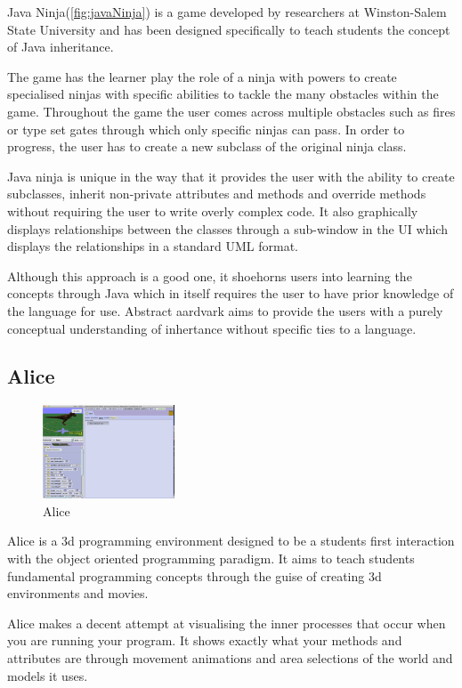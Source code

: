 \documentclass{l4proj}
\begin{document}
Java Ninja(\ref{fig:javaNinja}) is a game developed by researchers\cite{6632635} at Winston-Salem State University and has been designed specifically to teach students the concept of Java inheritance.

The game has the learner play the role of a ninja with powers to create specialised ninjas with specific abilities to tackle the many obstacles within the game. Throughout the game the user comes across multiple obstacles such as fires or type set gates through which only specific ninjas can pass. In order to progress, the user has to create a new subclass of the original ninja class. 

Java ninja is unique in the way that it provides the user with the ability to create subclasses, inherit non-private attributes and methods and override methods without requiring the user to write overly complex code. It also graphically displays relationships between the classes through a sub-window in the UI which displays the relationships in a standard UML format. 

Although this approach is a good one, it shoehorns users into learning the concepts through Java which in itself requires the user to have prior knowledge of the language for use. Abstract aardvark aims to provide the users with a purely conceptual understanding of inhertance without specific ties to a language. 

\subsection{Alice}
\begin{figure}[h]
    \centering
    \includegraphics[width=0.35\textwidth]{images/alice}
    \caption{Alice}
    \label{fig:Alice}
\end{figure}
 Alice is a 3d programming environment designed to be a students first interaction with the object oriented programming paradigm. It aims to teach students fundamental programming concepts through the guise of creating 3d environments and movies.
 
Alice makes a decent attempt at visualising the inner processes that occur when you are running your program. It shows exactly what your methods and attributes are through movement animations and area selections of the world and models it uses. 
\end{document}
